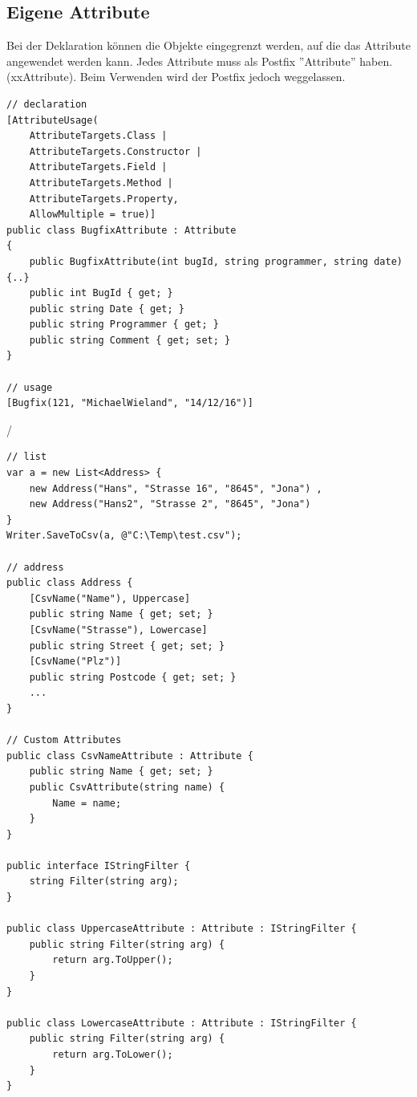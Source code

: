 \subsection{Eigene Attribute}
Bei der Deklaration können die Objekte eingegrenzt werden, auf die das Attribute angewendet werden kann. Jedes Attribute muss als Postfix ''Attribute'' haben. (xxAttribute). Beim Verwenden wird der Postfix jedoch weggelassen.
\begin{lstlisting}[caption=Custom Attributes]
// declaration
[AttributeUsage(
	AttributeTargets.Class |
	AttributeTargets.Constructor |
	AttributeTargets.Field |
	AttributeTargets.Method |
	AttributeTargets.Property,
	AllowMultiple = true)]
public class BugfixAttribute : Attribute
{
	public BugfixAttribute(int bugId, string programmer, string date) {..}
	public int BugId { get; }
	public string Date { get; }
	public string Programmer { get; }
	public string Comment { get; set; }
}

// usage
[Bugfix(121, "MichaelWieland", "14/12/16")]
\end{lstlisting}/

\begin{lstlisting}[caption=CSV Filter]
// list
var a = new List<Address> {
	new Address("Hans", "Strasse 16", "8645", "Jona") ,
	new Address("Hans2", "Strasse 2", "8645", "Jona")
}
Writer.SaveToCsv(a, @"C:\Temp\test.csv");

// address
public class Address {
	[CsvName("Name"), Uppercase]
	public string Name { get; set; }
	[CsvName("Strasse"), Lowercase]
	public string Street { get; set; }
	[CsvName("Plz")]
	public string Postcode { get; set; }
	...
}

// Custom Attributes
public class CsvNameAttribute : Attribute {
	public string Name { get; set; }
	public CsvAttribute(string name) {
		Name = name;
	}
}

public interface IStringFilter {
	string Filter(string arg); 
}

public class UppercaseAttribute : Attribute : IStringFilter {
	public string Filter(string arg) {
		return arg.ToUpper();
	}
}

public class LowercaseAttribute : Attribute : IStringFilter {
	public string Filter(string arg) {
		return arg.ToLower();
	}
}
\end{lstlisting}

